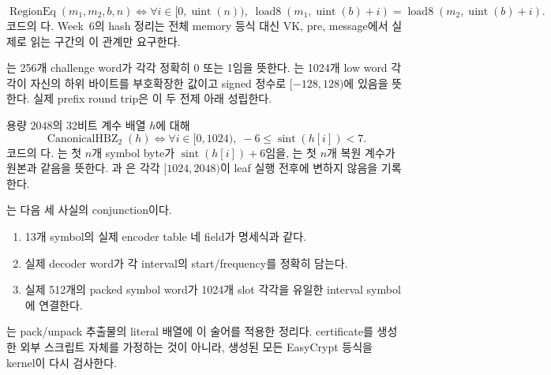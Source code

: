 \begin{definition}[메모리 구간 등식]
\label{def:region-eq}
\[
  \operatorname{RegionEq}(m_1,m_2,b,n)
  \Longleftrightarrow
  \forall i\in[0,\operatorname{uint}(n)),\;
  \operatorname{load8}(m_1,\operatorname{uint}(b)+i)
  =\operatorname{load8}(m_2,\operatorname{uint}(b)+i).
\]
코드의 다. Week~6의 hash 정리는 전체 memory 등식 대신
VK, pre, message에서 실제로 읽는 구간의 이 관계만 요구한다.
\end{definition}

\begin{definition}
\label{def:signature-prefix-canonical}
는 256개 challenge word가 각각 정확히 0 또는
1임을 뜻한다. 는 1024개 low word 각각이
자신의 하위 바이트를 부호확장한 값이고 signed 정수로 \([-128,128)\)에 있음을
뜻한다. 실제 prefix round trip은 이 두 전제 아래 성립한다.
\end{definition}

\begin{definition}
\label{def:canonical-hbz}
용량 \(2048\)의 32비트 계수 배열 \(h\)에 대해
\[
  \operatorname{CanonicalHBZ}_2(h)
  \Longleftrightarrow
  \forall i\in[0,1024),\;-6\le\operatorname{sint}(h[i])<7.
\]
코드의 다.
는 첫 \(n\)개 symbol byte가
\(\operatorname{sint}(h[i])+6\)임을, 는 첫
\(n\)개 복원 계수가 원본과 같음을 뜻한다. 과
은 각각 \([1024,2048)\)이 leaf 실행 전후에
변하지 않음을 기록한다.
\end{definition}

\begin{definition}
\label{def:hbz-table-certificate}
는 다음 세 사실의 conjunction이다.
\begin{enumerate}
  \item 13개 symbol의 실제 encoder table 네 field가 명세식과 같다.
  \item 실제 decoder word가 각 interval의 start/frequency를 정확히 담는다.
  \item 실제 512개의 packed symbol word가 1024개 slot 각각을 유일한
        interval symbol에 연결한다.
\end{enumerate}
는 pack/unpack 추출물의 literal
배열에 이 술어를 적용한 정리다. certificate를 생성한 외부 스크립트 자체를
가정하는 것이 아니라, 생성된 모든 EasyCrypt 등식을 kernel이 다시 검사한다.
\end{definition}


